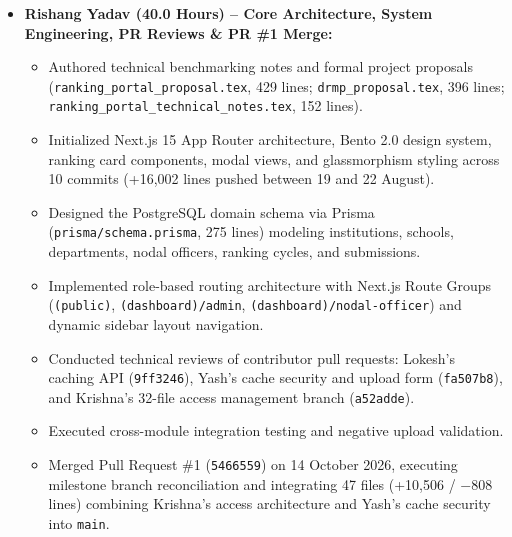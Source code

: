 \documentclass[11pt,a4paper]{article}
\begin{document}
\begin{itemize}[leftmargin=1.4em, itemsep=3pt]
\item \textbf{Rishang Yadav (40.0 Hours) -- Core Architecture, System Engineering, PR Reviews \& PR \#1 Merge:}
  \begin{itemize}[leftmargin=1.2em, itemsep=1.5pt]
  \item Authored technical benchmarking notes and formal project proposals (\texttt{ranking\_portal\_proposal.tex}, 429 lines; \texttt{drmp\_proposal.tex}, 396 lines; \texttt{ranking\_portal\_technical\_notes.tex}, 152 lines).
  \item Initialized Next.js 15 App Router architecture, Bento 2.0 design system, ranking card components, modal views, and glassmorphism styling across 10 commits (+16,002 lines pushed between 19 and 22 August).
  \item Designed the PostgreSQL domain schema via Prisma (\texttt{prisma/schema.prisma}, 275 lines) modeling institutions, schools, departments, nodal officers, ranking cycles, and submissions.
  \item Implemented role-based routing architecture with Next.js Route Groups (\texttt{(public)}, \texttt{(dashboard)/admin}, \texttt{(dashboard)/nodal-officer}) and dynamic sidebar layout navigation.
  \item Conducted technical reviews of contributor pull requests: Lokesh's caching API (\texttt{9ff3246}), Yash's cache security and upload form (\texttt{fa507b8}), and Krishna's 32-file access management branch (\texttt{a52adde}).
  \item Executed cross-module integration testing and negative upload validation.
  \item Merged Pull Request \#1 (\texttt{5466559}) on 14 October 2026, executing milestone branch reconciliation and integrating 47 files (+10,506 / $-$808 lines) combining Krishna's access architecture and Yash's cache security into \texttt{main}.
  \end{itemize}


\end{itemize}
\end{document}
